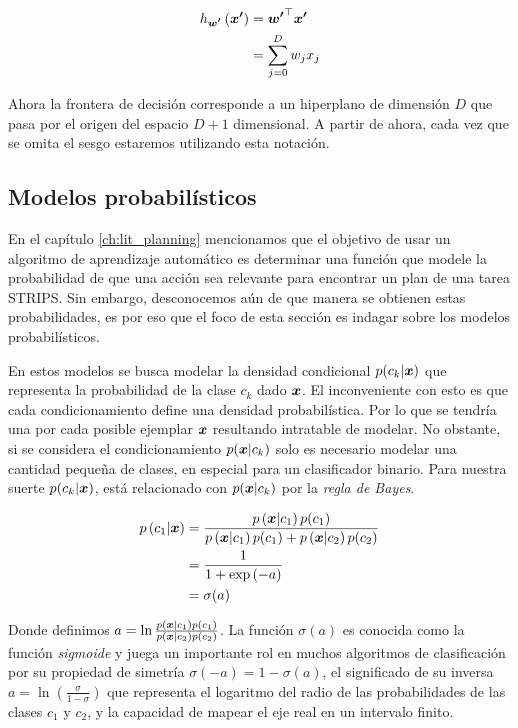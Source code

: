 \begin{align}
    h_{\boldsymbol{w'}}\left( \boldsymbol{x'} \right) &= \boldsymbol{w'}^{\top} \boldsymbol{x'}\\
                                           &= \sum_{j = 0 }^{D} w_j x_j
\end{align}

Ahora la frontera de decisión corresponde a un hiperplano de dimensión $D$ que
pasa por el origen del espacio $D + 1$ dimensional. A partir de ahora, cada vez
que se omita el sesgo estaremos utilizando esta notación.

\subsection{Modelos probabilísticos}
\label{subch:prob_models}

En el capítulo \ref{ch:lit_planning} mencionamos que el objetivo de usar un algoritmo de aprendizaje
automático es determinar una función que modele la probabilidad
de que una acción sea relevante para encontrar un plan de una tarea STRIPS. Sin
embargo, desconocemos aún de que manera se obtienen estas probabilidades, es por
eso que el foco de esta sección es indagar sobre los modelos probabilísticos.

En estos modelos se busca modelar la densidad condicional $p(c_k | \boldsymbol{x})$ que
representa la probabilidad de la clase $c_k$ dado $\boldsymbol{x}$. El inconveniente con
esto es que cada condicionamiento define una densidad probabilística. Por lo que
se tendría una por cada posible ejemplar $\boldsymbol{x}$ resultando intratable de
modelar. No obstante, si se considera el condicionamiento $p(\boldsymbol{x} | c_k)$
solo es necesario modelar una cantidad pequeña de clases, en especial para un
clasificador binario. Para nuestra suerte $p(c_k | \boldsymbol{x})$, está relacionado
con $p(\boldsymbol{x} | c_k)$ por la \emph{regla de Bayes}.

\begin{align}
    p\left( c_1 | \boldsymbol{x} \right) &= \frac{p\left( \boldsymbol{x} | c_1 \right)p(c_1)}{
                                            p\left( \boldsymbol{x} | c_1 \right) p(c_1) + 
                                            p\left( \boldsymbol{x} | c_2 \right)p(c_2)} \\
                                   &= \frac{1}{1 + \exp\left( -a \right)} \\
                                   &= \sigma(a)
\end{align}

Donde definimos $a = \ln \frac{p\left( \boldsymbol{x} | c_1 \right) p\left( c_1
\right)}{p\left( \boldsymbol{x} | c_2 \right) p\left( c_2 \right)}$. La función
$\sigma(a)$ es conocida como la función \emph{sigmoide} y juega un importante
rol en muchos algoritmos de clasificación por su propiedad de simetría
$\sigma(-a) = 1 - \sigma(a)$, el significado de su inversa $a = \ln \left(
\frac{\sigma}{1 - \sigma} \right)$ que representa el logaritmo del radio de las
probabilidades de las clases $c_1$ y $c_2$, y la capacidad de mapear el eje real
en un intervalo finito.

